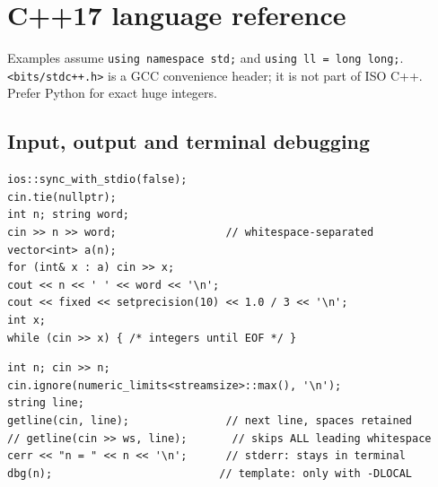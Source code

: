 \section{C++17 language reference}
Examples assume \texttt{using namespace std;} and
\texttt{using ll = long long;}. \texttt{<bits/stdc++.h>} is a GCC convenience
header; it is not part of ISO C++. Prefer Python for exact huge integers.

\subsection{Input, output and terminal debugging}\label{cpp:io}
\begin{lstlisting}[style=cpp]
ios::sync_with_stdio(false);
cin.tie(nullptr);
int n; string word;
cin >> n >> word;                 // whitespace-separated
vector<int> a(n);
for (int& x : a) cin >> x;
cout << n << ' ' << word << '\n';
cout << fixed << setprecision(10) << 1.0 / 3 << '\n';
int x;
while (cin >> x) { /* integers until EOF */ }
\end{lstlisting}
\begin{lstlisting}[style=cpp]
int n; cin >> n;
cin.ignore(numeric_limits<streamsize>::max(), '\n');
string line;
getline(cin, line);               // next line, spaces retained
// getline(cin >> ws, line);       // skips ALL leading whitespace
cerr << "n = " << n << '\n';      // stderr: stays in terminal
dbg(n);                          // template: only with -DLOCAL
\end{lstlisting}


